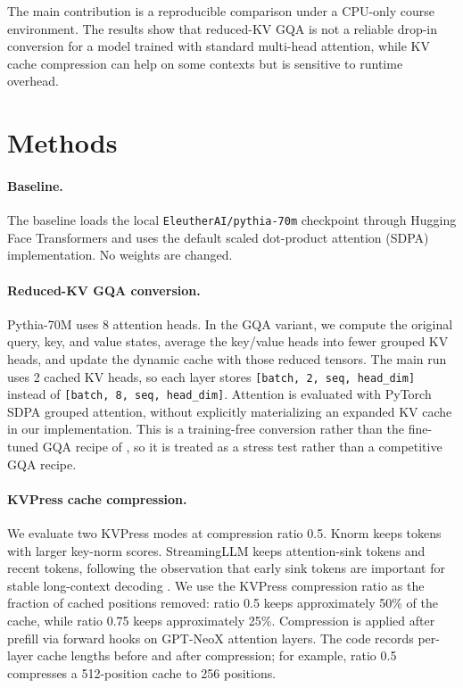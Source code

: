 \documentclass{article}
\begin{document}
The main contribution is a reproducible comparison under a CPU-only course environment. The results show that reduced-KV GQA is not a reliable drop-in conversion for a model trained with standard multi-head attention, while KV cache compression can help on some contexts but is sensitive to runtime overhead.

\section{Methods}

\paragraph{Baseline.}
The baseline loads the local \texttt{EleutherAI/pythia-70m} checkpoint through Hugging Face Transformers and uses the default scaled dot-product attention (SDPA) implementation. No weights are changed.

\paragraph{Reduced-KV GQA conversion.}
Pythia-70M uses 8 attention heads. In the GQA variant, we compute the original query, key, and value states, average the key/value heads into fewer grouped KV heads, and update the dynamic cache with those reduced tensors. The main run uses 2 cached KV heads, so each layer stores \texttt{[batch, 2, seq, head\_dim]} instead of \texttt{[batch, 8, seq, head\_dim]}. Attention is evaluated with PyTorch SDPA grouped attention, without explicitly materializing an expanded KV cache in our implementation. This is a training-free conversion rather than the fine-tuned GQA recipe of \citet{ainslie2023gqa}, so it is treated as a stress test rather than a competitive GQA recipe.

\paragraph{KVPress cache compression.}
We evaluate two KVPress modes at compression ratio 0.5. Knorm keeps tokens with larger key-norm scores. StreamingLLM keeps attention-sink tokens and recent tokens, following the observation that early sink tokens are important for stable long-context decoding \citep{xiao2023streamingllm}. We use the KVPress compression ratio as the fraction of cached positions removed: ratio 0.5 keeps approximately 50\% of the cache, while ratio 0.75 keeps approximately 25\%. Compression is applied after prefill via forward hooks on GPT-NeoX attention layers. The code records per-layer cache lengths before and after compression; for example, ratio 0.5 compresses a 512-position cache to 256 positions.
\end{document}
